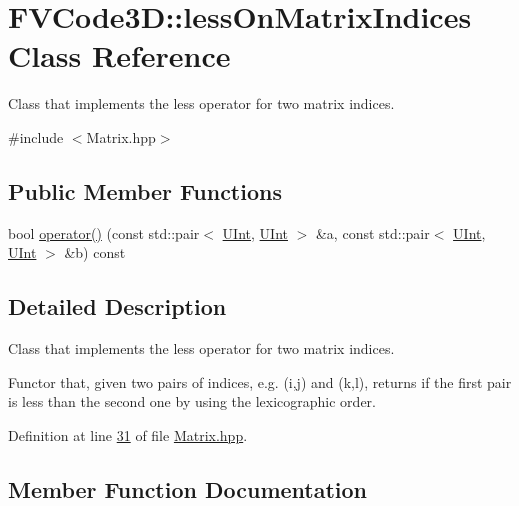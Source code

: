\hypertarget{classFVCode3D_1_1lessOnMatrixIndices}{}\section{F\+V\+Code3D\+:\+:less\+On\+Matrix\+Indices Class Reference}
\label{classFVCode3D_1_1lessOnMatrixIndices}


Class that implements the less operator for two matrix indices.  




{\ttfamily \#include $<$Matrix.\+hpp$>$}

\subsection*{Public Member Functions}
\begin{DoxyCompactItemize}
\item 
bool \hyperlink{classFVCode3D_1_1lessOnMatrixIndices_ae68b5f1d16e5354c18e79159159d170a}{operator()} (const std\+::pair$<$ \hyperlink{namespaceFVCode3D_a4bf7e328c75d0fd504050d040ebe9eda}{U\+Int}, \hyperlink{namespaceFVCode3D_a4bf7e328c75d0fd504050d040ebe9eda}{U\+Int} $>$ \&a, const std\+::pair$<$ \hyperlink{namespaceFVCode3D_a4bf7e328c75d0fd504050d040ebe9eda}{U\+Int}, \hyperlink{namespaceFVCode3D_a4bf7e328c75d0fd504050d040ebe9eda}{U\+Int} $>$ \&b) const 
\end{DoxyCompactItemize}


\subsection{Detailed Description}
Class that implements the less operator for two matrix indices. 

Functor that, given two pairs of indices, e.\+g. (i,j) and (k,l), returns if the first pair is less than the second one by using the lexicographic order. 

Definition at line \hyperlink{Matrix_8hpp_source_l00031}{31} of file \hyperlink{Matrix_8hpp_source}{Matrix.\+hpp}.



\subsection{Member Function Documentation}
